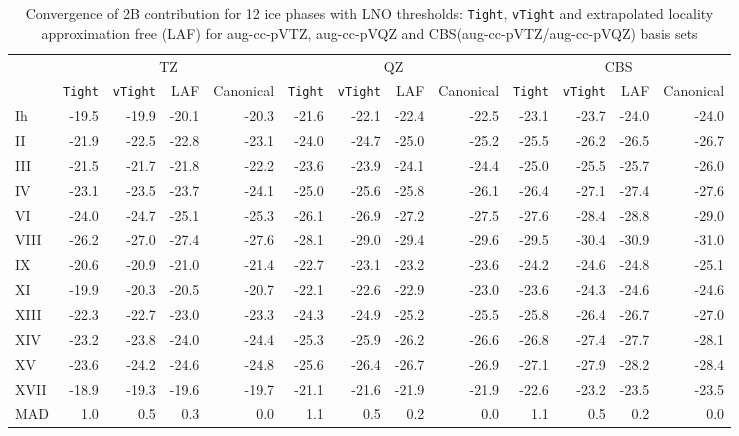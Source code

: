 \begin{table}[h]

\caption{\label{tab:2b_lno_conv}Convergence of 2B contribution for 12 ice phases with LNO thresholds: {\tt Tight}, {\tt vTight} and extrapolated locality approximation free (LAF) for aug-cc-pVTZ, aug-cc-pVQZ and CBS(aug-cc-pVTZ/aug-cc-pVQZ) basis sets}
\begin{tabular}{lrrrrrrrrrrrr}
\toprule
 & \multicolumn{4}{c}{TZ} & \multicolumn{4}{c}{QZ} & \multicolumn{4}{c}{CBS} \\ \cmidrule(lr){2-5} \cmidrule(lr){6-9} \cmidrule(lr){10-13} 
 & {\tt Tight} & {\tt vTight} & LAF & Canonical & {\tt Tight} & {\tt vTight} & LAF & Canonical & {\tt Tight} & {\tt vTight} & LAF & Canonical \\
\midrule
Ih & -19.5 & -19.9 & -20.1 & -20.3 & -21.6 & -22.1 & -22.4 & -22.5 & -23.1 & -23.7 & -24.0 & -24.0 \\
II & -21.9 & -22.5 & -22.8 & -23.1 & -24.0 & -24.7 & -25.0 & -25.2 & -25.5 & -26.2 & -26.5 & -26.7 \\
III & -21.5 & -21.7 & -21.8 & -22.2 & -23.6 & -23.9 & -24.1 & -24.4 & -25.0 & -25.5 & -25.7 & -26.0 \\
IV & -23.1 & -23.5 & -23.7 & -24.1 & -25.0 & -25.6 & -25.8 & -26.1 & -26.4 & -27.1 & -27.4 & -27.6 \\
VI & -24.0 & -24.7 & -25.1 & -25.3 & -26.1 & -26.9 & -27.2 & -27.5 & -27.6 & -28.4 & -28.8 & -29.0 \\
VIII & -26.2 & -27.0 & -27.4 & -27.6 & -28.1 & -29.0 & -29.4 & -29.6 & -29.5 & -30.4 & -30.9 & -31.0 \\
IX & -20.6 & -20.9 & -21.0 & -21.4 & -22.7 & -23.1 & -23.2 & -23.6 & -24.2 & -24.6 & -24.8 & -25.1 \\
XI & -19.9 & -20.3 & -20.5 & -20.7 & -22.1 & -22.6 & -22.9 & -23.0 & -23.6 & -24.3 & -24.6 & -24.6 \\
XIII & -22.3 & -22.7 & -23.0 & -23.3 & -24.3 & -24.9 & -25.2 & -25.5 & -25.8 & -26.4 & -26.7 & -27.0 \\
XIV & -23.2 & -23.8 & -24.0 & -24.4 & -25.3 & -25.9 & -26.2 & -26.6 & -26.8 & -27.4 & -27.7 & -28.1 \\
XV & -23.6 & -24.2 & -24.6 & -24.8 & -25.6 & -26.4 & -26.7 & -26.9 & -27.1 & -27.9 & -28.2 & -28.4 \\
XVII & -18.9 & -19.3 & -19.6 & -19.7 & -21.1 & -21.6 & -21.9 & -21.9 & -22.6 & -23.2 & -23.5 & -23.5 \\
\midrule MAD & 1.0 & 0.5 & 0.3 & 0.0 & 1.1 & 0.5 & 0.2 & 0.0 & 1.1 & 0.5 & 0.2 & 0.0 \\
\bottomrule
\end{tabular}

\end{table}